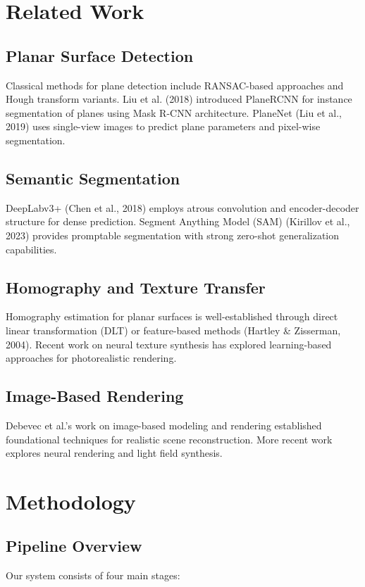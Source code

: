 \documentclass[11pt]{article}
\begin{document}
\section{Related Work}

\subsection{Planar Surface Detection}
Classical methods for plane detection include RANSAC-based approaches and Hough transform variants. Liu et al. (2018) introduced PlaneRCNN for instance segmentation of planes using Mask R-CNN architecture. PlaneNet (Liu et al., 2019) uses single-view images to predict plane parameters and pixel-wise segmentation.

\subsection{Semantic Segmentation}
DeepLabv3+ (Chen et al., 2018) employs atrous convolution and encoder-decoder structure for dense prediction. Segment Anything Model (SAM) (Kirillov et al., 2023) provides promptable segmentation with strong zero-shot generalization capabilities.

\subsection{Homography and Texture Transfer}
Homography estimation for planar surfaces is well-established through direct linear transformation (DLT) or feature-based methods (Hartley \& Zisserman, 2004). Recent work on neural texture synthesis has explored learning-based approaches for photorealistic rendering.

\subsection{Image-Based Rendering}
Debevec et al.'s work on image-based modeling and rendering established foundational techniques for realistic scene reconstruction. More recent work explores neural rendering and light field synthesis.

\section{Methodology}

\subsection{Pipeline Overview}
Our system consists of four main stages:
\end{document}
